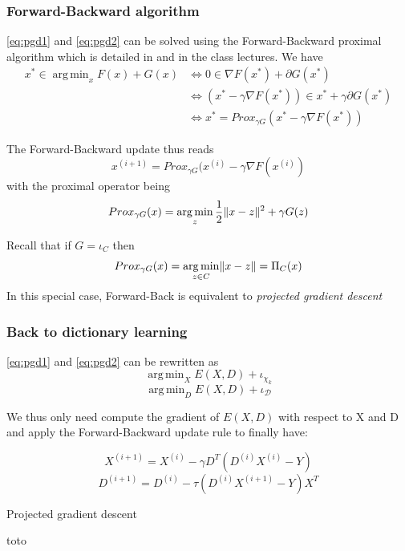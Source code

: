 \documentclass[a4paper,11pt]{article}
\DeclarePairedDelimiter\norm{\lVert}{\rVert} %
\DeclareMathOperator*{\argmin}{arg\,min} %
\begin{document}
\subsubsection*{Forward-Backward algorithm}
\ref{eq:pgd1} and \ref{eq:pgd2} can be solved using the Forward-Backward proximal algorithm which is detailed in \cite{parikh14} and in the class lectures.
We have
\begin{equation*}
\begin{split}
x^* \in \argmin_x F(x) + G(x) & \Longleftrightarrow 0 \in \nabla F(x^*) + \partial G(x^*)\\
							  & \Longleftrightarrow (x^* - \gamma \nabla F(x^*)) \in x^* + \gamma \partial G(x^*)\\
                              & \Longleftrightarrow x^* = Prox_{\gamma G} (x^* - \gamma \nabla F(x^*))
\end{split}
\end{equation*}

The Forward-Backward update thus reads
$$x^{(i+1)} = Prox_{\gamma G} (x^{(i)} - \gamma \nabla F(x^{(i)})$$
with the proximal operator being
$$Prox_{\gamma G}(x) = \argmin_z \frac{1}{2} \norm{x - z}^2 + \gamma G(z)$$

Recall that if $G = \iota_C$ then
$$Prox_{\gamma G}(x) = \argmin_{z \in C} \norm{x - z} = \Pi_C(x)$$
In this special case, Forward-Back is equivalent to \emph{projected gradient descent}


\subsubsection*{Back to dictionary learning}
\ref{eq:pgd1} and \ref{eq:pgd2} can be rewritten as
$$\argmin_X E(X,D) + \iota_{\chi_k}$$
$$\argmin_D E(X,D) + \iota_{\mathcal{D}}$$

We thus only need compute the gradient of $E(X,D)$ with respect to X and D and apply the Forward-Backward update rule to finally have:

$$ X^{(i+1)} = X^{(i)} - \gamma D^T (D^{(i)}X^{(i)} - Y) $$
$$ D^{(i+1)} = D^{(i)} - \tau (D^{(i)}X^{(i+1)} - Y) X^T $$

\begin{algorithm}
\caption{Projected gradient descent}\label{pgd}
\begin{algorithmic}[1]
\State toto
\end{algorithmic}
\end{algorithm}
\end{document}
